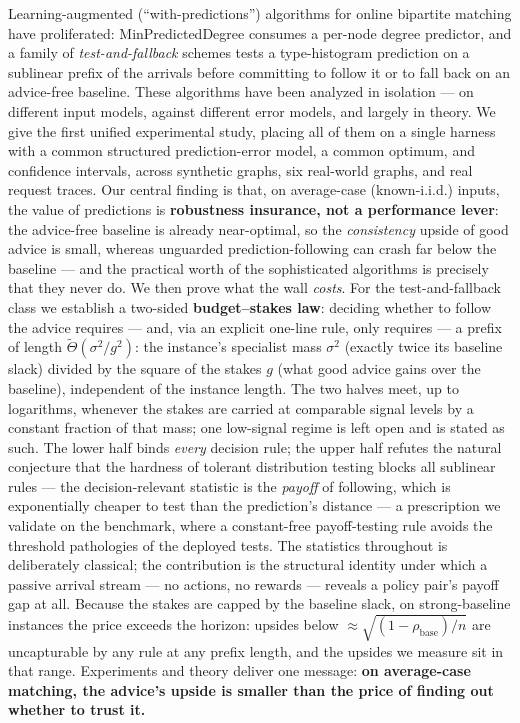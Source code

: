 Learning-augmented (``with-predictions'') algorithms for online
bipartite matching have proliferated: MinPredictedDegree consumes a
per-node degree predictor, and a family of \emph{test-and-fallback}
schemes tests a type-histogram prediction on a sublinear prefix of the
arrivals before committing to follow it or to fall back on an
advice-free baseline. These algorithms have been analyzed in isolation
--- on different input models, against different error models, and
largely in theory. We give the first unified experimental study, placing
all of them on a single harness with a common structured
prediction-error model, a common optimum, and confidence intervals,
across synthetic graphs, six real-world graphs, and real request traces.
Our central finding is that, on average-case (known-i.i.d.) inputs, the
value of predictions is \textbf{robustness insurance, not a performance
lever}: the advice-free baseline is already near-optimal, so the
\emph{consistency} upside of good advice is small, whereas unguarded
prediction-following can crash far below the baseline --- and the
practical worth of the sophisticated algorithms is precisely that they
never do. We then prove what the wall \emph{costs}. For the
test-and-fallback class we establish a two-sided \textbf{budget--stakes
law}: deciding whether to follow the advice requires --- and, via an
explicit one-line rule, only requires --- a prefix of length
\(\tilde\Theta(\sigma^2/g^2)\): the instance's specialist mass
\(\sigma^2\) (exactly twice its baseline slack) divided by the square of
the stakes \(g\) (what good advice gains over the baseline), independent
of the instance length. The two halves meet, up to logarithms, whenever
the stakes are carried at comparable signal levels by a constant
fraction of that mass; one low-signal regime is left open and is stated
as such. The lower half binds \emph{every} decision rule; the upper half
refutes the natural conjecture that the hardness of tolerant
distribution testing blocks all sublinear rules --- the
decision-relevant statistic is the \emph{payoff} of following, which is
exponentially cheaper to test than the prediction's distance --- a
prescription we validate on the benchmark, where a constant-free
payoff-testing rule avoids the threshold pathologies of the deployed
tests. The statistics throughout is deliberately classical; the
contribution is the structural identity under which a passive arrival
stream --- no actions, no rewards --- reveals a policy pair's payoff gap
at all. Because the stakes are capped by the baseline slack, on
strong-baseline instances the price exceeds the horizon: upsides below
\(\approx\sqrt{(1-\rho_{\mathrm{base}})/n}\) are uncapturable by any
rule at any prefix length, and the upsides we measure sit in that range.
Experiments and theory deliver one message: \textbf{on average-case
matching, the advice's upside is smaller than the price of finding out
whether to trust it.}
